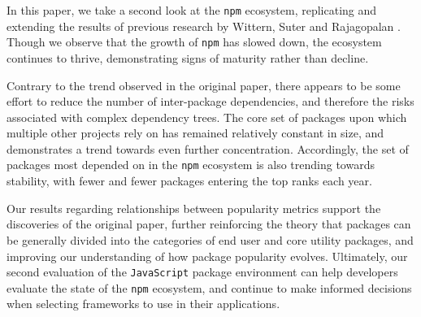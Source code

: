 \documentclass[10pt,conference]{IEEEtran}
\def\code#1{\texttt{#1}}
\begin{document}
In this paper, we take a second look at the \code{npm} ecosystem,
replicating and extending the results of previous research by 
Wittern, Suter and Rajagopalan \cite{Wittern:2016}. Though
we observe that the growth of \code{npm} has slowed down, the ecosystem
continues to thrive, demonstrating signs of maturity rather than decline.

Contrary to the trend observed in the original paper, there appears to be
some effort to reduce the number of inter-package dependencies, and therefore the risks
associated with complex dependency trees. The core set of packages upon which
multiple other projects rely on has remained relatively constant in size, and
demonstrates a trend towards even further concentration. Accordingly, the set of packages
most depended on in the \code{npm} ecosystem is also trending towards stability, with
fewer and fewer packages entering the top ranks each year. 

Our results regarding relationships between popularity metrics support the discoveries of the
original paper, further reinforcing the theory that packages can be generally divided into the categories
of end user and core utility packages, and improving our understanding of how package popularity evolves.
Ultimately, our second evaluation of the \code{JavaScript} package environment can help developers evaluate
the state of the \code{npm} ecosystem, and continue to make informed decisions when selecting frameworks
to use in their applications.
\end{document}
